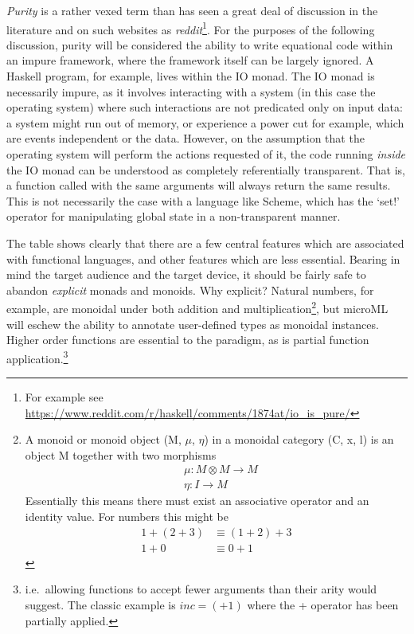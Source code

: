 \documentclass[12pt, a4paper]{report}
\begin{document}
\textit{Purity} is a rather vexed term than has seen a great deal of discussion in
the literature and on such websites as \textit{reddit}\footnote{For example see
\url{https://www.reddit.com/r/haskell/comments/1874at/io_is_pure/}}. For the purposes of the
following discussion, purity will be considered the ability to write equational code within an
impure framework, where the framework itself can be largely ignored. A Haskell program, for example,
lives within the IO monad. The IO monad is necessarily impure, as it involves interacting with
a system (in this case the operating system) where such interactions are not predicated only on
input data: a system might run out of memory, or experience a power cut for example, which are
events independent or the data. However, on the assumption that the operating system will perform
the actions requested of it, the code running \textit{inside} the IO monad can be understood as
completely referentially transparent. That is, a function called with the same arguments will always
return the same results. This is not necessarily the case with a language like Scheme, which has the
`set!' operator for manipulating global state in a non-transparent manner.

The table shows clearly that there are a few central features which are associated with
functional languages, and other features which are less essential. Bearing in mind the target
audience and the target device, it should be fairly safe to abandon \textit{explicit} monads
and monoids. Why explicit? Natural numbers, for example, are monoidal under both addition and
multiplication\footnote{A monoid or monoid object (M, $\mu$, $\eta$) in a monoidal category (C, x,
l) is an object M together with two morphisms
\begin{align*}
    &\mu: M \otimes M \rightarrow M \\
    &\eta: I \rightarrow M
\end{align*}
Essentially this means there must exist an associative operator and an identity value. For numbers
this might be 
\begin{align*}
    1 + (2 + 3) &\equiv (1 + 2) + 3 \\
    1 + 0 &\equiv 0 + 1
\end{align*}
}, but microML will eschew the ability to annotate user-defined types as monoidal instances. Higher
order functions are essential to the paradigm, as is partial function application.\footnote{i.e.\
allowing functions to accept fewer arguments than their arity would suggest. The classic example is
$inc = (+1)$ where the + operator has been partially applied.}
\end{document}

